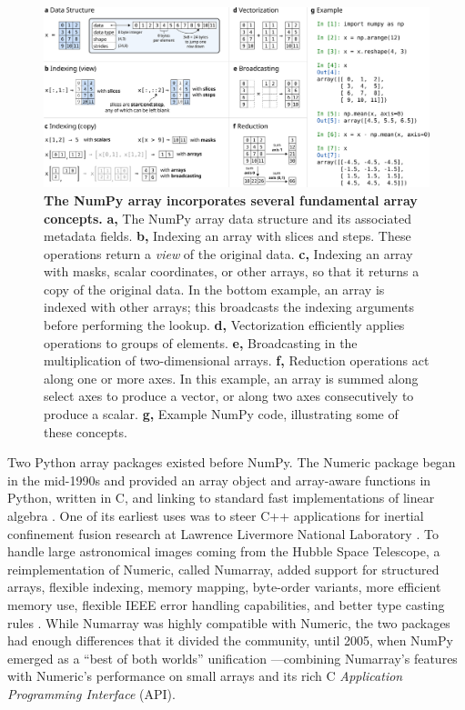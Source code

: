 \begin{figure}[h]
  \centering
  \includegraphics[width=\textwidth]{static/sketches/concepts}
  \caption{\textbf{The NumPy array incorporates several fundamental array concepts.}
    \textbf{a,} The NumPy array data structure and its associated metadata fields.
    \textbf{b,} Indexing an array with slices and steps. These
  operations return a \emph{view} of the original data.
    \textbf{c,} Indexing an array with masks, scalar coordinates, or
  other arrays, so that it returns a copy of the original data. In the
  bottom example, an array is indexed with other arrays; this broadcasts the indexing arguments before performing the lookup.
    \textbf{d,} Vectorization efficiently applies operations to groups
  of elements.
    \textbf{e,} Broadcasting in the multiplication of two-dimensional arrays.
    \textbf{f,} Reduction operations act along one or more axes. In this
    example, an array is summed along select axes to produce a vector, or along two axes consecutively to
    produce a scalar.
    \textbf{g,} Example NumPy code, illustrating some of these concepts.
   }
  \label{fig:array-concepts}
\end{figure}

Two Python array packages existed before NumPy.
The Numeric package began in the mid-1990s and provided an array object and array-aware functions
in Python, written in C, and linking to standard fast implementations of linear
algebra \cite{dubois1996numerical,Numericmanual}.
One of its earliest uses was to steer C++ applications for
inertial confinement fusion research at
Lawrence Livermore National Laboratory \cite{yang1997steering}.
To handle large astronomical images coming from the Hubble Space Telescope,
a reimplementation of Numeric, called Numarray, added
support for structured arrays, flexible indexing, memory mapping, byte-order variants,
more efficient memory use, flexible IEEE error handling capabilities, and
better type casting rules \cite{greenfield2003numarray}.
While Numarray was highly compatible with Numeric, the two packages had enough
differences that it divided the community, until 2005, when NumPy emerged as a
``best of both worlds'' unification \cite{oliphant2006guide}---combining
Numarray's features with Numeric's performance on small arrays and its rich C
\emph{Application Programming Interface} (API).

